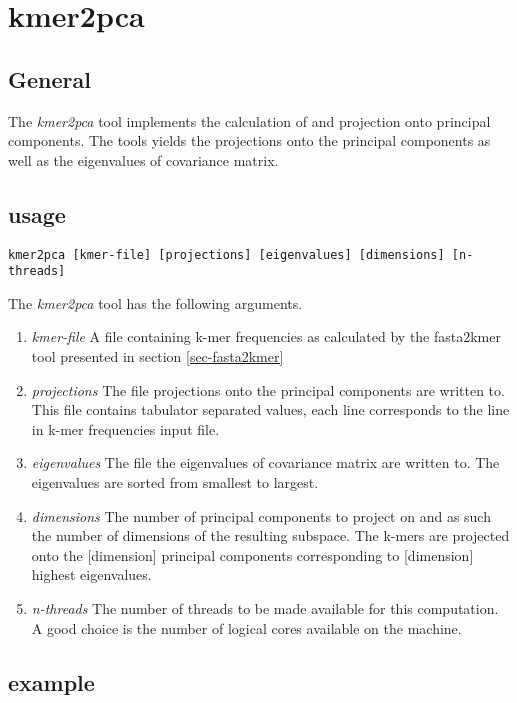 \section{kmer2pca} \label{sec-kmer2pca}

\subsection{General}

The \emph{kmer2pca} tool implements the calculation of and projection onto
principal components. The tools yields the projections onto the
principal components as well as the eigenvalues of covariance matrix.

\subsection{usage}

\begin{lstlisting}
kmer2pca [kmer-file] [projections] [eigenvalues] [dimensions] [n-threads]
\end{lstlisting}
The \emph{kmer2pca} tool has the following arguments.
\begin{enumerate}
  \item \emph{kmer-file} A file containing k-mer frequencies as
    calculated by the fasta2kmer tool presented in section
    \ref{sec-fasta2kmer}
  \item \emph{projections} The file projections onto the
    principal components are written to. This file contains
    tabulator separated values, each line corresponds to the line in
    k-mer frequencies input file.
  \item \emph{eigenvalues} The file the eigenvalues of
    covariance matrix are written to. The eigenvalues are sorted from
    smallest to largest.
  \item \emph{dimensions} The number of principal components to
    project on and as such the number of dimensions of the resulting
    subspace. The k-mers are projected onto the [dimension]
    principal components corresponding to [dimension] highest
    eigenvalues.
  \item \emph{n-threads} The number of threads to be made available
    for this computation. A good choice is the number of logical cores
    available on the machine.
\end{enumerate}

\subsection{example}

